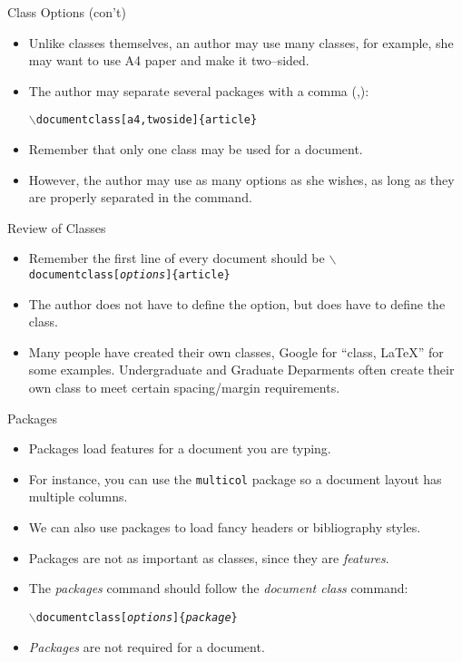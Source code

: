 \documentclass[pdf]{prosper}
\begin{document}
\begin{slide}{Class Options (con't)}
	\begin{itemize}
		\item Unlike classes themselves, an author may use many classes, for example, she may want to use A4 paper and make it two--sided.
		\item The author may separate several packages with a comma (,):
			\begin{center}
			\texttt{$\backslash$documentclass[a4,twoside]\{article\}}
			\end{center}
		\item Remember that only one class may be used for a document.
		\item However, the author may use as many options as she wishes, as long as they are properly separated in the command.
	\end{itemize}
\end{slide}
\begin{slide}{Review of Classes}
	\begin{itemize}
		\item Remember the first line of every document should be \texttt{$\backslash$documentclass[\textit{options}]\{article\}}
		\item The author does not have to define the option, but does have to define the class.
		\item Many people have created their own classes, Google for ``class, LaTeX'' for some examples. Undergraduate and Graduate Deparments often create their own class to meet certain spacing/margin requirements.
	\end{itemize}
\end{slide}
\begin{slide}{Packages}
	\begin{itemize}
		\item Packages load features for a document you are typing.
		\item For instance, you can use the \texttt{multicol} package so a document layout has multiple columns.
		\item We can also use packages to load fancy headers or bibliography styles.
		\item Packages are not as important as classes, since they are \emph{features}.
		\item The \textit{packages} command should follow the \textit{document class} command:
			\begin{center}
			\texttt{$\backslash$documentclass[\textit{options}]\{\textit{package}\}}
			\end{center}
		\item \textit{Packages} are not required for a document.
	\end{itemize}
\end{slide}
\end{document}

